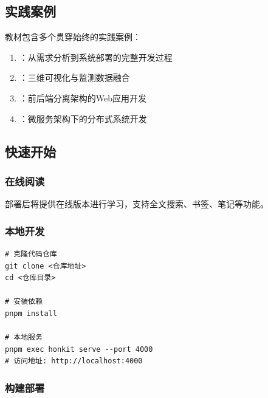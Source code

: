 \hypertarget{ux5b9eux8df5ux6848ux4f8b-1}{%
\subsection{实践案例}\label{ux5b9eux8df5ux6848ux4f8b-1}}

教材包含多个贯穿始终的实践案例：

\begin{enumerate}
\def\labelenumi{\arabic{enumi}.}
\tightlist
\item
  ：从需求分析到系统部署的完整开发过程
\item
  ：三维可视化与监测数据融合
\item
  ：前后端分离架构的Web应用开发
\item
  ：微服务架构下的分布式系统开发
\end{enumerate}

\hypertarget{ux5febux901fux5f00ux59cb-1}{%
\subsection{快速开始}\label{ux5febux901fux5f00ux59cb-1}}

\hypertarget{ux5728ux7ebfux9605ux8bfb-1}{%
\subsubsection{在线阅读}\label{ux5728ux7ebfux9605ux8bfb-1}}

部署后将提供在线版本进行学习，支持全文搜索、书签、笔记等功能。

\hypertarget{ux672cux5730ux5f00ux53d1-1}{%
\subsubsection{本地开发}\label{ux672cux5730ux5f00ux53d1-1}}

\begin{lstlisting}[style=terminal]
# 克隆代码仓库
git clone <仓库地址>
cd <仓库目录>

# 安装依赖
pnpm install

# 本地服务
pnpm exec honkit serve --port 4000
# 访问地址: http://localhost:4000
\end{lstlisting}

\hypertarget{ux6784ux5efaux90e8ux7f72-1}{%
\subsubsection{构建部署}\label{ux6784ux5efaux90e8ux7f72-1}}

